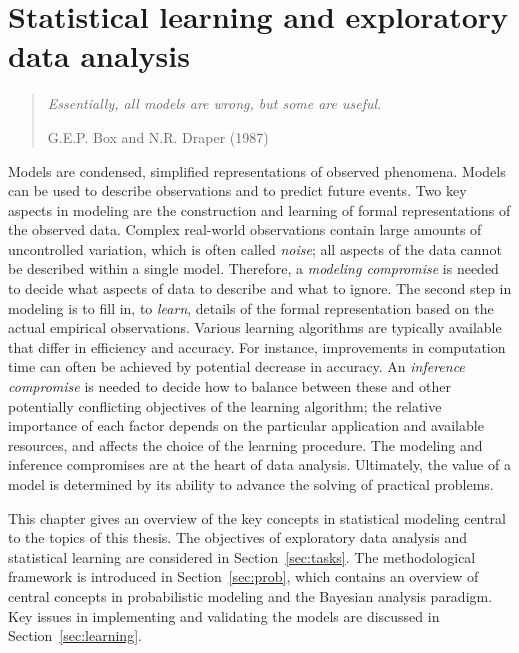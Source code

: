 \chapter{Statistical learning and exploratory data analysis}\label{ch:meth}

\begin{quotation}
\emph{Essentially, all models are wrong, but some are useful.}
\begin{flushright}
G.E.P. Box and N.R. Draper (1987)
\end{flushright}
\end{quotation}

Models are condensed, simplified representations of observed
phenomena. Models can be used to describe observations and to predict
future events. Two key aspects in modeling are the construction and
learning of formal representations of the observed data. Complex
real-world observations contain large amounts of uncontrolled
variation, which is often called {\it noise}; all aspects of the data
cannot be described within a single model. Therefore, a {\it modeling
compromise} is needed to decide what aspects of data to describe and
what to ignore. The second step in modeling is to fill in, to {\it
learn}, details of the formal representation based on the actual
empirical observations. Various learning algorithms are typically
available that differ in efficiency and accuracy. For instance,
improvements in computation time can often be achieved by potential
decrease in accuracy. An {\it inference compromise} is needed to
decide how to balance between these and other potentially conflicting
objectives of the learning algorithm; the relative importance of each
factor depends on the particular application and available resources,
and affects the choice of the learning procedure. The modeling and
inference compromises are at the heart of data analysis. Ultimately,
the value of a model is determined by its ability to advance the
solving of practical problems. 

This chapter gives an overview of the key concepts in statistical
modeling central to the topics of this thesis. The objectives of
exploratory data analysis and statistical learning are considered in
Section~\ref{sec:tasks}. The methodological framework is introduced in
Section~\ref{sec:prob}, which contains an overview of central concepts
in probabilistic modeling and the Bayesian analysis paradigm. Key
issues in implementing and validating the models are discussed in
Section~\ref{sec:learning}.


